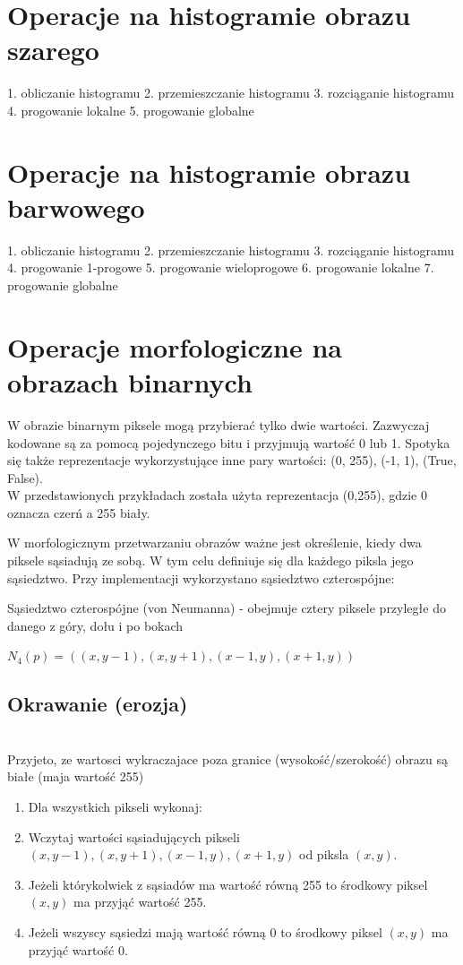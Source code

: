 \documentclass[final,a4paper,openany,12pt]{mwbk}
\begin{document}
\chapter{Operacje na histogramie obrazu szarego}
1. obliczanie histogramu
2. przemieszczanie histogramu
3. rozciąganie histogramu
4. progowanie lokalne
5. progowanie globalne

\chapter{Operacje na histogramie obrazu barwowego}
1. obliczanie histogramu
2. przemieszczanie histogramu
3. rozciąganie histogramu
4. progowanie 1-progowe
5. progowanie wieloprogowe
6. progowanie lokalne
7. progowanie globalne

\chapter{Operacje morfologiczne na obrazach binarnych}

W obrazie binarnym piksele mogą przybierać tylko dwie wartości. Zazwyczaj kodowane są za pomocą pojedynczego bitu i przyjmują wartość 0 lub 1. Spotyka się także reprezentacje wykorzystujące inne pary wartości: (0, 255), (-1, 1), (True, False). \\
W przedstawionych przykładach została użyta reprezentacja (0,255), gdzie 0 oznacza czerń a 255 biały.

W morfologicznym przetwarzaniu obrazów ważne jest określenie, kiedy dwa piksele sąsiadują ze sobą. W tym celu definiuje się dla każdego piksla jego sąsiedztwo. Przy implementacji wykorzystano sąsiedztwo czterospójne: 

	Sąsiedztwo czterospójne (von Neumanna) - obejmuje cztery piksele przyległe do danego z góry, dołu i po bokach
	\begin{center}
	 $N_{4}(p)=((x,y-1),(x,y+1),(x-1,y),(x+1,y))$
	 \end{center}

\section{ Okrawanie (erozja)}
\hfill\\
\indent
       Przyjeto, ze wartosci wykraczajace poza granice (wysokość/szerokość) obrazu są białe (maja wartość 255)\\
	\begin{enumerate}	
		\item Dla wszystkich pikseli wykonaj:
		\item Wczytaj wartości sąsiadujących pikseli $(x,y-1),(x,y+1),(x-1,y),(x+1,y)$ od piksla $(x,y)$.
		\item Jeżeli którykolwiek z sąsiadów ma wartość równą 255 to środkowy piksel $(x,y)$ ma przyjąć wartość 255. 
		\item Jeżeli wszyscy sąsiedzi mają wartość równą 0 to środkowy piksel $(x,y)$ ma przyjąć wartość 0.
	\end{enumerate}
\end{document}
